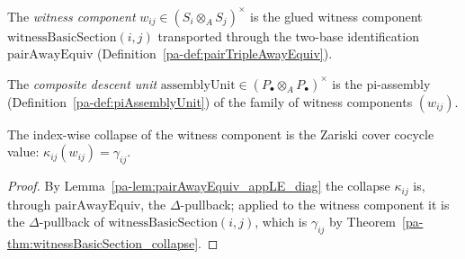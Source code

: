 \begin{definition}
  \label{pa-def:witnessComponent}
  \leanok

  The \emph{witness component} \(w_{ij} \in (S_i \otimes_A S_j)^{\times}\) is the glued witness
  component \(\mathrm{witnessBasicSection}(i, j)\) transported through the two-base
  identification \(\mathrm{pairAwayEquiv}\) (Definition~\ref{pa-def:pairTripleAwayEquiv}).
\end{definition}

\begin{definition}
  \label{pa-def:assemblyUnit}
  \leanok

  The \emph{composite descent unit} \(\mathrm{assemblyUnit} \in (P_{\!\bullet} \otimes_A
  P_{\!\bullet})^{\times}\) is the pi-assembly (Definition~\ref{pa-def:piAssemblyUnit}) of the
  family of witness components \((w_{ij})\).
\end{definition}

\begin{theorem}
  \label{pa-thm:componentCollapse_witnessComponent}
  \leanok

  The index-wise collapse of the witness component is the Zariski cover cocycle value:
  \(\kappa_{ij}(w_{ij}) = \gamma_{ij}\).
\end{theorem}
\begin{proof}
  \leanok
  By Lemma~\ref{pa-lem:pairAwayEquiv_appLE_diag} the collapse \(\kappa_{ij}\) is, through
  \(\mathrm{pairAwayEquiv}\), the \(\Delta\)-pullback; applied to the witness component it is the
  \(\Delta\)-pullback of \(\mathrm{witnessBasicSection}(i, j)\), which is \(\gamma_{ij}\) by
  Theorem~\ref{pa-thm:witnessBasicSection_collapse}.
\end{proof}

